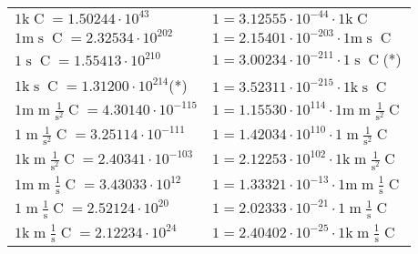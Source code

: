 \begin{center}
\begin{longtable}{l l}
{\color{gray}$1 \bm{\mathrm{ k}}{}{}{\operatorname{C}}{} = 1.50244\cdot10^{43} $}   & {\color{gray}$ 1 = 3.12555\cdot10^{-44} \cdot 1 \bm{\mathrm{ k}}{}{}{\operatorname{C}}{}$}  \\
{\color{gray}$1 \bm{\mathrm{ m}}{}{\operatorname{s}}{\operatorname{C}}{} = 2.32534\cdot10^{202} $}   & {\color{gray}$ 1 = 2.15401\cdot10^{-203} \cdot 1 \bm{\mathrm{ m}}{}{\operatorname{s}}{\operatorname{C}}{}$}  \\
{\color{black}$1 \bm{\mathrm{ }}{}{\operatorname{s}}{\operatorname{C}}{} = 1.55413\cdot10^{210} $}   & {\color{black}$ 1 = 3.00234\cdot10^{-211} \cdot 1 \bm{\mathrm{ }}{}{\operatorname{s}}{\operatorname{C}}{}$}\quad(*)\\
{\color{gray}$1 \bm{\mathrm{ k}}{}{\operatorname{s}}{\operatorname{C}}{} = 1.31200\cdot10^{214} $}\quad(*) & {\color{gray}$ 1 = 3.52311\cdot10^{-215} \cdot 1 \bm{\mathrm{ k}}{}{\operatorname{s}}{\operatorname{C}}{}$}  \\
{\color{gray}$1 \bm{\mathrm{ m}}{\operatorname{m}}\frac1{\operatorname{s}^2}{\operatorname{C}}{} = 4.30140\cdot10^{-115} $}   & {\color{gray}$ 1 = 1.15530\cdot10^{114} \cdot 1 \bm{\mathrm{ m}}{\operatorname{m}}\frac1{\operatorname{s}^2}{\operatorname{C}}{}$}  \\
{\color{black}$1 \bm{\mathrm{ }}{\operatorname{m}}\frac1{\operatorname{s}^2}{\operatorname{C}}{} = 3.25114\cdot10^{-111} $}   & {\color{black}$ 1 = 1.42034\cdot10^{110} \cdot 1 \bm{\mathrm{ }}{\operatorname{m}}\frac1{\operatorname{s}^2}{\operatorname{C}}{}$}  \\
{\color{gray}$1 \bm{\mathrm{ k}}{\operatorname{m}}\frac1{\operatorname{s}^2}{\operatorname{C}}{} = 2.40341\cdot10^{-103} $}   & {\color{gray}$ 1 = 2.12253\cdot10^{102} \cdot 1 \bm{\mathrm{ k}}{\operatorname{m}}\frac1{\operatorname{s}^2}{\operatorname{C}}{}$}  \\
{\color{gray}$1 \bm{\mathrm{ m}}{\operatorname{m}}\frac1{\operatorname{s}}{\operatorname{C}}{} = 3.43033\cdot10^{12} $}   & {\color{gray}$ 1 = 1.33321\cdot10^{-13} \cdot 1 \bm{\mathrm{ m}}{\operatorname{m}}\frac1{\operatorname{s}}{\operatorname{C}}{}$}  \\
{\color{black}$1 \bm{\mathrm{ }}{\operatorname{m}}\frac1{\operatorname{s}}{\operatorname{C}}{} = 2.52124\cdot10^{20} $}   & {\color{black}$ 1 = 2.02333\cdot10^{-21} \cdot 1 \bm{\mathrm{ }}{\operatorname{m}}\frac1{\operatorname{s}}{\operatorname{C}}{}$}  \\
{\color{gray}$1 \bm{\mathrm{ k}}{\operatorname{m}}\frac1{\operatorname{s}}{\operatorname{C}}{} = 2.12234\cdot10^{24} $}   & {\color{gray}$ 1 = 2.40402\cdot10^{-25} \cdot 1 \bm{\mathrm{ k}}{\operatorname{m}}\frac1{\operatorname{s}}{\operatorname{C}}{}$}  \\

\end{longtable}
\end{center}
